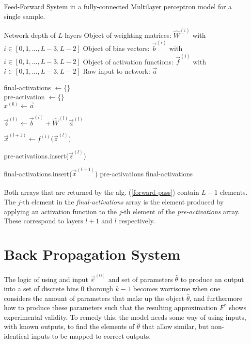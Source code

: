 \documentclass[12pt,letterpaper]{article}
\begin{document}
\begin{algorithm}
\label{forward-pass}
\caption{Feed-Forward System in a fully-connected Multilayer perceptron model for a single sample.}
\begin{algorithmic}

\REQUIRE Network depth of $L$ layers
\REQUIRE Object of weighting matrices: $\hat{W}^{(i)}$ with $i \in [0,1,...,L-3,L-2]$
\REQUIRE Object of bias vectors: $\vec{b}^{(i)}$ with $i \in [0,1,...,L-3,L-2]$
\REQUIRE Object of activation functions: $\vec{f}^{(i)}$ with $i \in [0,1,...,L-3,L-2]$
\REQUIRE Raw input to network: $\vec{a}$

final-activations $\leftarrow \{\}$ \\
pre-activation $\leftarrow \{\}$	\\
$x^{(0)} \leftarrow \vec{a}$ 		\\

\item $\vec{z}^{(l)} \leftarrow \vec{b}^{(l)} + \hat{W}^{(l)} \vec{a}^{(l)}$
\item $\vec{x}^{(l+1)} \leftarrow f^{(l)} \big( \vec{z}^{(l)} \big)$
\item pre-activations.insert($\vec{z}^{(l)}$)
\item final-activations.insert($\vec{x}^{(l+1)}$)
\ENDFOR
\RETURN pre-activations
\RETURN final-activations
\end{algorithmic}
\end{algorithm}

\paragraph*{}Both arrays  that are returned by the alg. (\ref{forward-pass}) contain $L-1$ elements. The $j$-th element in the \textit{final-activations} array is the element produced by applying an activation function to the $j$-th element of the \textit{pre-activations} array. These correspond to layers $l+1$ and $l$ respectively.


\section{Back Propagation System}

\paragraph*{}The logic of using and input $\vec{x}^{(0)}$ and set of parameters $\hat{\theta}$ to produce an output into a set of discrete bins $0$ thorough $k-1$ becomes worrisome when one considers the amount of parameters that make up the object $\hat{\theta}$, and furthermore how to produce these parameters such that the resulting approximation $F^*$ shows experimental validity. To remedy this, the model needs some way of using inputs, with known outputs, to find the elements of $\hat{\theta}$ that allow similar, but non-identical inputs to be mapped to correct outputs. 
\end{document}
